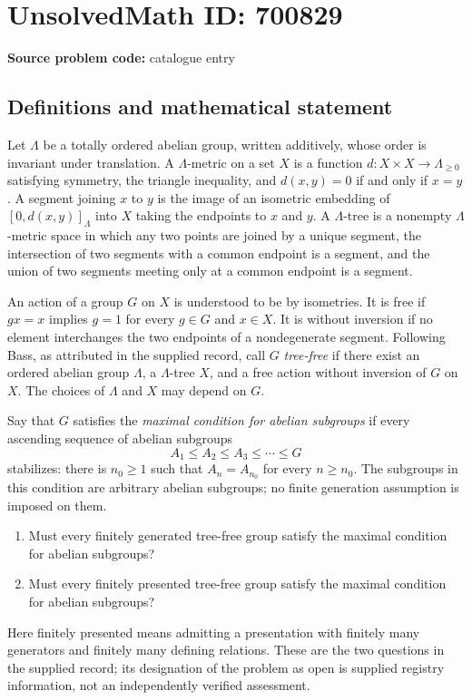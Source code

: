 \documentclass[11pt]{article}
\begin{document}
\section*{UnsolvedMath ID: 700829}
\textbf{Source problem code:} catalogue entry
\subsection{Definitions and mathematical statement}
Let \(\Lambda\) be a totally ordered abelian group, written additively, whose order is invariant under translation. A \(\Lambda\)-metric on a set \(X\) is a function \(d:X\times X\to\Lambda_{\geq 0}\) satisfying symmetry, the triangle inequality, and \(d(x,y)=0\) if and only if \(x=y\). A segment joining \(x\) to \(y\) is the image of an isometric embedding of \([0,d(x,y)]_{\Lambda}\) into \(X\) taking the endpoints to \(x\) and \(y\). A \(\Lambda\)-tree is a nonempty \(\Lambda\)-metric space in which any two points are joined by a unique segment, the intersection of two segments with a common endpoint is a segment, and the union of two segments meeting only at a common endpoint is a segment.

An action of a group \(G\) on \(X\) is understood to be by isometries. It is free if \(gx=x\) implies \(g=1\) for every \(g\in G\) and \(x\in X\). It is without inversion if no element interchanges the two endpoints of a nondegenerate segment. Following Bass, as attributed in the supplied record, call \(G\) \emph{tree-free} if there exist an ordered abelian group \(\Lambda\), a \(\Lambda\)-tree \(X\), and a free action without inversion of \(G\) on \(X\). The choices of \(\Lambda\) and \(X\) may depend on \(G\).

Say that \(G\) satisfies the \emph{maximal condition for abelian subgroups} if every ascending sequence of abelian subgroups
\[
A_1\leq A_2\leq A_3\leq\cdots\leq G
\]
stabilizes: there is \(n_0\geq 1\) such that \(A_n=A_{n_0}\) for every \(n\geq n_0\). The subgroups in this condition are arbitrary abelian subgroups; no finite generation assumption is imposed on them.

\begin{enumerate}
\item[(a)] Must every finitely generated tree-free group satisfy the maximal condition for abelian subgroups?
\item[(b)] Must every finitely presented tree-free group satisfy the maximal condition for abelian subgroups?
\end{enumerate}
Here finitely presented means admitting a presentation with finitely many generators and finitely many defining relations. These are the two questions in the supplied record; its designation of the problem as open is supplied registry information, not an independently verified assessment.
\end{document}
